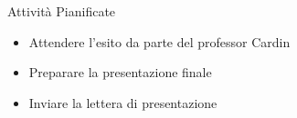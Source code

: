\documentclass{beamer}
\begin{document}
\begin{frame}
    \begin{block}{Attività Pianificate}
        \begin{itemize}
            \item Attendere l'esito da parte del professor Cardin
            \item Preparare la presentazione finale
            \item Inviare la lettera di presentazione
        \end{itemize}
    \end{block}
\end{frame}


\end{document}
